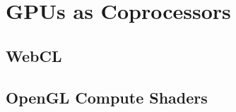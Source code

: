 \section{GPUs as Coprocessors} \label{chapter_webgpu}

\subsection{WebCL}

\subsection{OpenGL Compute Shaders}
